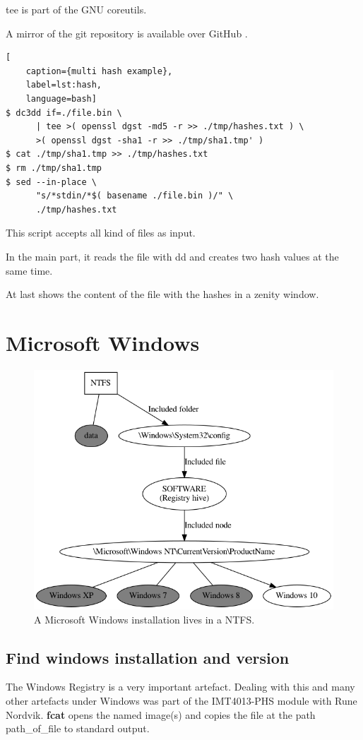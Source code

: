 tee is part of the GNU coreutils.

A mirror of the git repository is available over GitHub \cite{CoreUtils}.

\begin{lstlisting}[
    caption={multi hash example},
    label=lst:hash,
    language=bash]
$ dc3dd if=./file.bin \
      | tee >( openssl dgst -md5 -r >> ./tmp/hashes.txt ) \
      >( openssl dgst -sha1 -r >> ./tmp/sha1.tmp' )
$ cat ./tmp/sha1.tmp >> ./tmp/hashes.txt
$ rm ./tmp/sha1.tmp
$ sed --in-place \
      "s/*stdin/*$( basename ./file.bin )/" \
      ./tmp/hashes.txt
\end{lstlisting}

\noindent This script accepts all kind of files as input.

In the main part, it reads the file with dd and creates two hash values at the same time.

At last shows the content of the file with the hashes in a zenity window.

\section{Microsoft Windows}

\begin{figure}[htbp]  %
  \centering
  \includegraphics[width=.5\textwidth]{figures/NTFS-to-Win10.png}
  \caption[NTFS and Microsoft Windows]{A Microsoft Windows installation lives in a NTFS.}
  \label{fig:ntfs-win}
\end{figure}

\subsection{Find windows installation and version}

The Windows Registry is a very important artefact. Dealing with this and many other artefacts under Windows was part of the IMT4013-PHS module with Rune Nordvik.\newline
\newline
\noindent \textbf{fcat} opens the named image(s) and copies the file at the path path\_of\_file to standard output.

